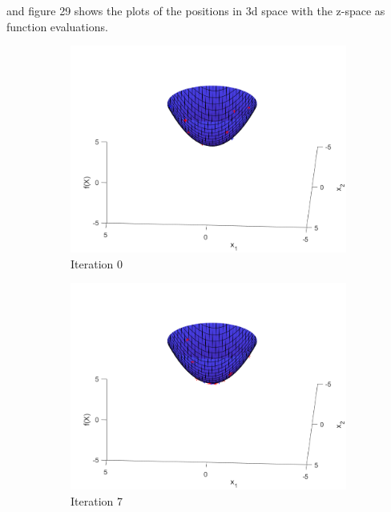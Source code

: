 and figure 29 shows the plots of the positions in 3d space with the z-space as function evaluations.

\begin{figure}
  \centering
  \begin{subfigure}[b]{0.4\textwidth}
    \includegraphics[width=\textwidth]{img/smpl/sphr/loa-iter-0}
    \caption{Iteration 0}
    \label{fig:s2-iter-0}
  \end{subfigure}
  \begin{subfigure}[b]{0.4\textwidth}
    \includegraphics[width=\textwidth]{img/smpl/sphr/loa-iter-7}
    \caption{Iteration 7}
    \label{fig:s2-iter-1}
  \end{subfigure}
  \begin{subfigure}[b]{0.4\textwidth}

\end{subfigure}
\end{figure}

